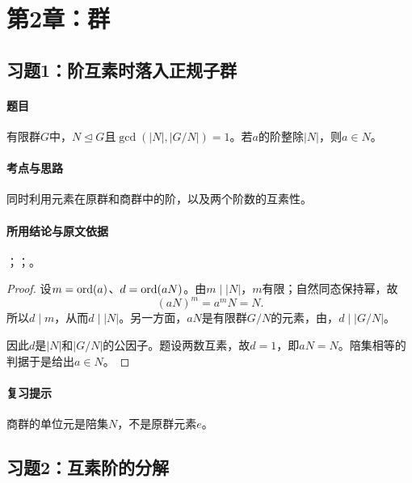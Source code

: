 \clearpage\section{第2章：群}

\subsection{习题1：\texorpdfstring{阶互素时落入正规子群}{阶互素时落入正规子群}}
\label{ex:2:1}

\paragraph{题目}
有限群$G$中，$N\trianglelefteq G$且$\gcd(|N|,|G/N|)=1$。若$a$的阶整除$|N|$，则$a\in N$。

\paragraph{考点与思路}
同时利用元素在原群和商群中的阶，以及两个阶数的互素性。

\paragraph{所用结论与原文依据}
；；。


\begin{proof}
设$m=\operatorname{ord}(a)$、$d=\operatorname{ord}(aN)$。由$m\mid|N|$，$m$有限；自然同态保持幂，故
\[
(aN)^m=a^mN=N.
\]
所以$d\mid m$，从而$d\mid|N|$。另一方面，$aN$是有限群$G/N$的元素，由，$d\mid|G/N|$。

因此$d$是$|N|$和$|G/N|$的公因子。题设两数互素，故$d=1$，即$aN=N$。陪集相等的判据于是给出$a\in N$。
\end{proof}

\paragraph{复习提示}
商群的单位元是陪集$N$，不是原群元素$e$。


\subsection{习题2：\texorpdfstring{互素阶的分解}{互素阶的分解}}
\label{ex:2:2}

